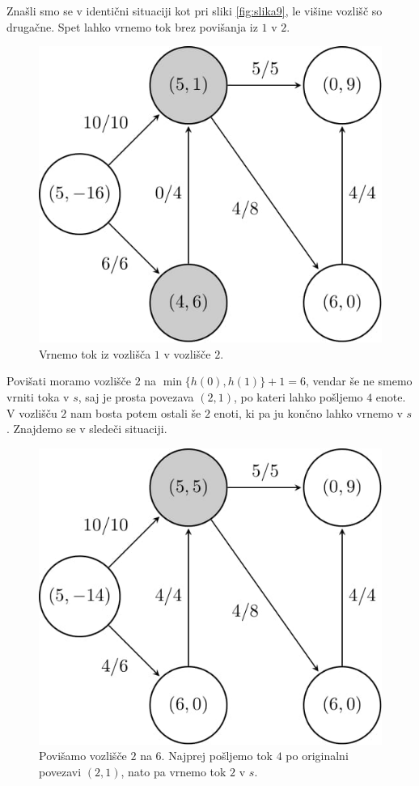 \documentclass[mat1]{fmfdelo}
\begin{document}
Znašli smo se v identični situaciji kot pri sliki \ref{fig:slika9}, le višine vozlišč so drugačne. Spet lahko vrnemo tok brez povišanja
iz $1$ v $2$.

\begin{figure}[H]
  \centering
  \includegraphics[scale=.358]{images/graf2-14/graf2-14-1.jpg}
  \caption{Vrnemo tok iz vozlišča $1$ v vozlišče $2$.}
\end{figure}

Povišati moramo vozlišče $2$ na $\min\{h(0), h(1)\} + 1 = 6$, vendar še ne smemo vrniti toka v $s$, saj je prosta povezava $(2,1)$, po kateri
lahko pošljemo $4$ enote. V vozlišču $2$ nam bosta potem ostali še $2$ enoti, ki pa ju končno lahko vrnemo v $s$. Znajdemo se v sledeči situaciji.

\begin{figure}[H]
  \centering
  \includegraphics[scale=.358]{images/graf2-15/graf2-15-1.jpg}
  \caption{Povišamo vozlišče $2$ na $6$. Najprej pošljemo tok $4$ po originalni povezavi $(2,1)$, nato pa vrnemo tok $2$ v $s$.}
\end{figure}
\end{document}
